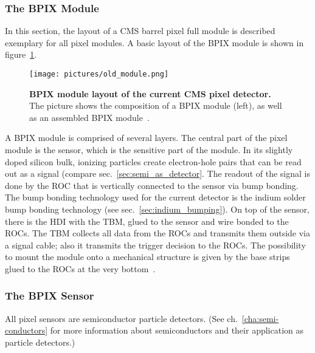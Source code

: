 \subsubsection{The \acs{BPIX} Module}
In this section, the layout of a \ac{CMS} barrel pixel full module is described exemplary for all pixel modules. A basic layout of the \acs{BPIX} module is shown in figure~\ref{fig:old_module}.
\begin{figure}
\begin{center}
\texttt{[image: pictures/old\_module.png]}
\end{center}
\caption[BPIX module layout of the current CMS pixel detector]{\textbf{\acs{BPIX} module layout of the current \acs{CMS} pixel detector.} The picture shows the composition of a \acs{BPIX} module (left), as well as an assembled \acs{BPIX} module~\cite{Erd09}.}\label{fig:old_module}
\end{figure}
A \acs{BPIX} module is comprised of several layers. The central part of the pixel module is the sensor, which is the sensitive part of the module. In its slightly doped silicon bulk, ionizing particles create electron-hole pairs that can be read out as a signal (compare sec.~\ref{sec:semi_as_detector}. The readout of the signal is done by the \ac{ROC} that is vertically connected to the sensor via bump bonding. The bump bonding technology used for the current detector is the indium solder bump bonding technology (see sec.~\ref{sec:indium_bumping}). On top of the sensor, there is the \ac{HDI} with the \ac{TBM}, glued to the sensor and wire bonded to the \ac{ROC}s. The \ac{TBM} collects all data from the \ac{ROC}s and transmits them outside via a signal cable; also it transmits the trigger decision to the \ac{ROC}s. The possibility to mount the module onto a mechanical structure is given by the base strips glued to the \ac{ROC}s at the very bottom~\cite{Erd09}.

\subsubsection{The \acs{BPIX} Sensor}\label{sec:BPIX_sensor}
All pixel sensors are semiconductor particle detectors. (See ch.~\ref{cha:semi-conductors} for more information about semiconductors and their application as particle detectors.)

